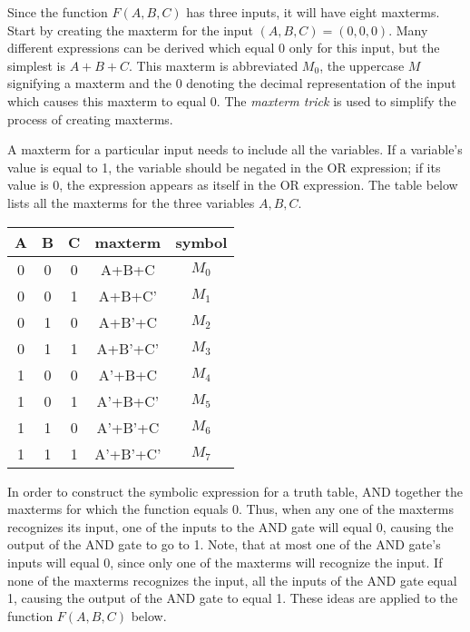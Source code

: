 Since the function $F(A,B,C)$ has three inputs, it will have eight 
maxterms.  Start by creating the maxterm for the input $(A,B,C)=(0,0,0)$.
Many different expressions can be derived which equal 0 only for
this input, but the simplest is $A+B+C$.  This maxterm is
abbreviated $M_0$, the uppercase $M$ signifying a maxterm 
and the 0 denoting the decimal representation of the input which 
causes this maxterm to equal 0.  The \textit{maxterm trick} 
 is used to simplify the process of creating
maxterms.  

A maxterm for a particular input needs to include all the variables.
If a variable's value is equal to 1, the variable should be negated 
in the OR expression; if its value is 0, the expression appears as itself in the
OR expression. The table below lists all the maxterms for the three 
variables $A,B,C$.

\begin{tabular}{c|c|c||c|c}
A & B & C & maxterm   & symbol \\ \hline
0 & 0 & 0 & A+B+C     & $M_0$   \\ \hline
0 & 0 & 1 & A+B+C'    & $M_1$   \\ \hline
0 & 1 & 0 & A+B'+C    & $M_2$   \\ \hline
0 & 1 & 1 & A+B'+C'   & $M_3$   \\ \hline
1 & 0 & 0 & A'+B+C    & $M_4$   \\ \hline
1 & 0 & 1 & A'+B+C'   & $M_5$   \\ \hline
1 & 1 & 0 & A'+B'+C   & $M_6$   \\ \hline
1 & 1 & 1 & A'+B'+C'  & $M_7$   \\ 
\end{tabular}


In order to construct the symbolic expression for a truth table, 
AND together the maxterms for which the function equals 0. Thus, 
when any one of the maxterms recognizes its input, one of the 
inputs to the AND gate will equal 0, causing the output of the 
AND gate to go to 1.  Note, that at most one of the AND gate's 
inputs will equal 0, since only one of the maxterms will recognize 
the input.  If none of the maxterms recognizes the input, all the 
inputs of the AND gate equal 1, causing the output of the 
AND gate to equal 1.  These ideas are applied to 
the function $F(A,B,C)$ below.

